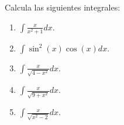 \documentclass[12pt,a4paper]{article}
\begin{document}
    \begin{mdframed}[style=mdbluebox,frametitle={Ejercicio 2}]
        Calcula las siguientes integrales:
        \begin{enumerate}
            \item[(a)] $\displaystyle\int\frac{x}{x^{2}+1}dx$.
            \item[(b)] $\displaystyle\int\sin^{2}(x)\cos(x)dx$.
            \item[(c)] $\displaystyle\int\frac{x}{\sqrt{4-x^{2}}}dx$.
            \item[(d)] $\displaystyle\int\frac{x}{\sqrt{9+x^{2}}}dx$.
            \item[(e)] $\displaystyle\int\frac{x}{\sqrt{x^{2}-2}}dx$.    
        \end{enumerate}
    \end{mdframed}
\end{document}
